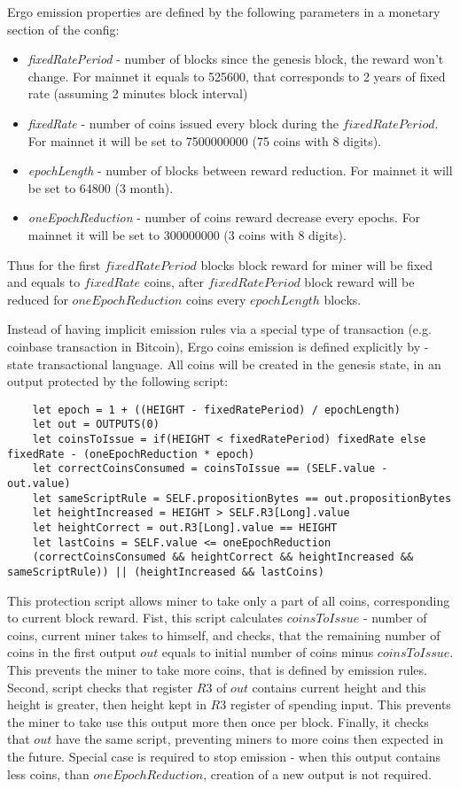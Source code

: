 Ergo emission properties are defined by the following parameters in a monetary section of the config:

\begin{itemize}
    \item{\em fixedRatePeriod } - number of blocks since the genesis block, the reward won't change.
    For mainnet it equals to 525600, that corresponds to 2 years of fixed rate (assuming 2 minutes block interval)
    \item{\em fixedRate } - number of coins issued every block during the $fixedRatePeriod$.
    For mainnet it will be set to 7500000000 (75 coins with 8 digits).
    \item{\em epochLength } - number of blocks between reward reduction.
    For mainnet it will be set to 64800 (3 month).
    \item{\em oneEpochReduction } - number of coins reward decrease every epochs.
    For mainnet it will be set to 300000000 (3 coins with 8 digits).
\end{itemize}

Thus for the first $fixedRatePeriod$ blocks block reward for miner will be fixed and equals to $fixedRate$ \ergo{} coins,
after $fixedRatePeriod$ block reward will be reduced for $oneEpochReduction$ coins every $epochLength$ blocks.

Instead of having implicit emission rules via a special type of transaction (e.g. coinbase transaction in Bitcoin),
Ergo coins emission is defined explicitly by \Sigma-state transactional language.
All \ergo{} coins will be created in the genesis state, in an output protected by the following script:

\begin{verbatim}
    let epoch = 1 + ((HEIGHT - fixedRatePeriod) / epochLength)
    let out = OUTPUTS(0)
    let coinsToIssue = if(HEIGHT < fixedRatePeriod) fixedRate else fixedRate - (oneEpochReduction * epoch)
    let correctCoinsConsumed = coinsToIssue == (SELF.value - out.value)
    let sameScriptRule = SELF.propositionBytes == out.propositionBytes
    let heightIncreased = HEIGHT > SELF.R3[Long].value
    let heightCorrect = out.R3[Long].value == HEIGHT
    let lastCoins = SELF.value <= oneEpochReduction
    (correctCoinsConsumed && heightCorrect && heightIncreased && sameScriptRule)) || (heightIncreased && lastCoins)
\end{verbatim}

This protection script allows miner to take only a part of all coins, corresponding to current block reward.
Fist, this script calculates $coinsToIssue$ - number of coins, current miner takes to himself,
and checks, that the remaining  number of coins in the first output $out$ equals to initial
number of coins minus $coinsToIssue$.
This prevents the miner to take more coins, that is defined by emission rules.
Second, script checks that register $R3$ of $out$ contains current height and this height is greater, then height
kept in $R3$ register of spending input.
This prevents the miner to take use this output more then once per block.
Finally, it checks that $out$ have the same script, preventing miners to more coins then expected in the future.
Special case is required to stop emission - when this output contains less coins, than $oneEpochReduction$,
creation of a new output is not required.
